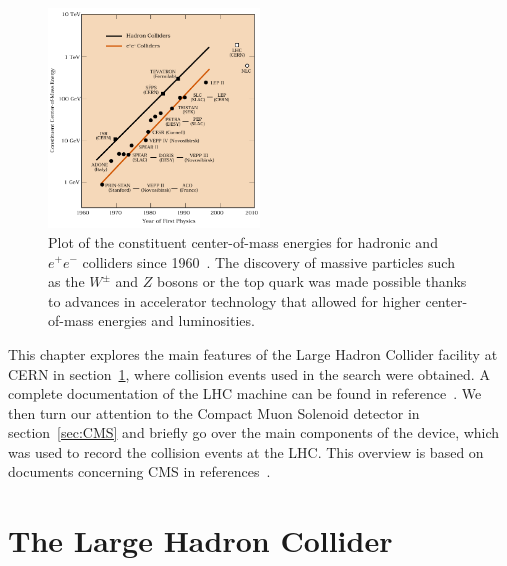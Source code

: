 \begin{figure}[htbp]
  \centering
  \includegraphics[width=0.5\textwidth]{fig/experiment/ecm_livingston.pdf}
  \caption[
    Plot of the constituent center-of-mass energies for hadronic and $e^+e^-$ colliders since 1960.
    The discovery of massive particles such as the $W^\pm$ and $Z$ bosons or the top quark was made possible thanks to advances in accelerator technology that allowed for higher center-of-mass energies and luminosities.
  ]{
    Plot of the constituent center-of-mass energies for hadronic and $e^+e^-$ colliders since 1960~\cite{Panofsky}.
    The discovery of massive particles such as the $W^\pm$ and $Z$ bosons or the top quark was made possible thanks to advances in accelerator technology that allowed for higher center-of-mass energies and luminosities.
  }
  \label{fig:ECMplot}
\end{figure}

This chapter explores the main features of the Large Hadron Collider facility at CERN in section~\ref{sec:LHC}, where collision events used in the search were obtained.
A complete documentation of the LHC machine can be found in reference~\cite{Evans:1129806}.
We then turn our attention to the Compact Muon Solenoid detector in section~\ref{sec:CMS} and briefly go over the main components of the device, which was used to record the collision events at the LHC.
This overview is based on documents concerning CMS in references~\cite{Chatrchyan:1129810,taylor_2011}.

\section{The Large Hadron Collider}
\label{sec:LHC}

